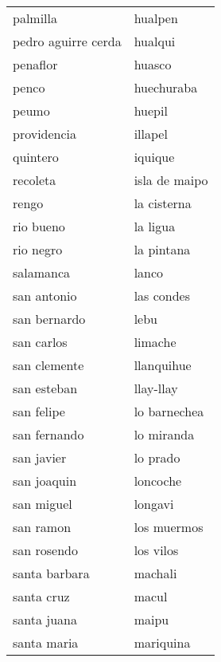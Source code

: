 \begin{longtable}{l|l}
                   palmilla   &    hualpen   \\   
                   pedro aguirre cerda   &    hualqui   \\   
                   penaflor   &    huasco   \\   
                   penco   &    huechuraba   \\   
                   peumo   &    huepil   \\   
                   providencia   &    illapel   \\   
                   quintero   &    iquique   \\   
                   recoleta   &    isla de maipo   \\   
                   rengo   &    la cisterna   \\   
                   rio bueno   &    la ligua   \\   
                   rio negro   &    la pintana   \\   
                   salamanca   &    lanco   \\   
                   san antonio   &    las condes   \\   
                   san bernardo   &    lebu   \\   
                   san carlos   &    limache   \\   
                   san clemente   &    llanquihue   \\   
                   san esteban   &    llay-llay   \\   
                   san felipe   &    lo barnechea   \\   
                   san fernando   &    lo miranda   \\   
                   san javier   &    lo prado   \\   
                   san joaquin   &    loncoche   \\   
                   san miguel   &    longavi   \\   
                   san ramon   &    los muermos   \\   
                   san rosendo   &    los vilos   \\   
                   santa barbara   &    machali   \\   
                   santa cruz   &    macul   \\   
                   santa juana   &    maipu   \\   
                   santa maria   &    mariquina   \\   

\end{longtable}
